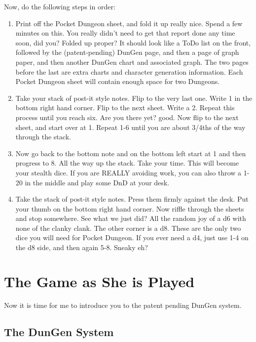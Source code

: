 \documentclass[a6paper,hidelinks]{article}
\begin{document}
Now, do the following steps in order:
\begin{enumerate}
\item Print off the Pocket Dungeon sheet, and fold it up really nice. Spend a few minutes on this. You really didn't need to get that report done any time soon, did you? Folded up proper? It should look like a ToDo list on the front, followed by the (patent-pending) DunGen page, and then a page of graph paper, and then another DunGen chart and associated graph. The two pages before the last are extra charts and character generation information. Each Pocket Dungeon sheet will contain enough space for two Dungeons.
\item Take your stack of post-it style notes. Flip to the very last one. Write 1 in the bottom right hand corner. Flip to the next sheet. Write a 2. Repeat this process until you reach six. Are you there yet? good. Now flip to the next sheet, and start over at 1. Repeat 1-6 until you are about 3/4ths of the way through the stack.
\item Now go back to the bottom note and on the bottom left start at 1 and then progress to 8. All the way up the stack. Take your time. This will become your
stealth dice. If you are REALLY avoiding work, you can also throw a 1-20 in the middle and play some DnD at your desk.
\item Take the stack of post-it style notes. Press them firmly against the desk. Put your thumb on the bottom right hand corner. Now riffle through the sheets and stop somewhere. See what we just did? All the random joy of a d6 with none of the clanky clank. The other corner is a d8. These are the only two dice you will need for Pocket Dungeon. If you ever need a d4, just use 1-4 on the d8 side, and then again 5-8. Sneaky eh?

\end{enumerate}

\section{The Game as She is Played}

Now it is time for me to introduce you to the patent pending DunGen system.

\subsection{The DunGen System}
\end{document}
